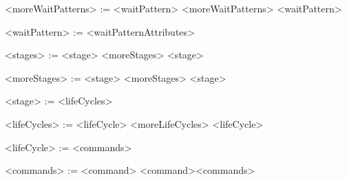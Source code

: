 \begin{grammar}
	<moreWaitPatterns> := <waitPattern> <moreWaitPatterns>
						\alt <waitPattern>
						
	<waitPattern>	:= <waitPatternAttributes>

	<stages> := <stage> <moreStages>
				\alt <stage>
				
	<moreStages> := <stage> <moreStages>
				\alt <stage>
					
	<stage>		:= <lifeCycles>
	
	<lifeCycles> := <lifeCycle> <moreLifeCycles>
				
	<lifeCycle>  := <commands>
	
	<commands> := <command>
				\alt <command><commands>
\end{grammar}